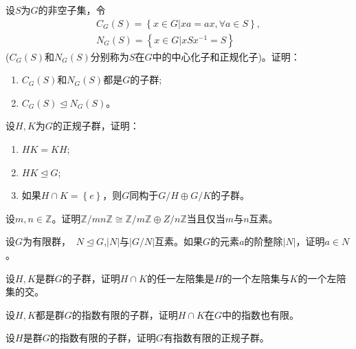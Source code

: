 \begin{prob}
设$S$为$G$的非空子集，令
\begin{equation*}
\begin{array}{*{20}{l}}
    C_{G}\left(S\right)=\left\{x\in G \vert xa=ax,\forall a\in S\right\},\\
    N_{G}\left(S\right)=\left\{x\in G \vert xSx^{-1}=S\right\}
\end{array}
\end{equation*}
($C_{G}\left(S\right)$和$N_{G}\left(S\right)$分别称为$S$在$G$中的{\heiti 中心化子}和{\heiti 正规化子})。证明：
\begin{enumerate}[$(1)$]
\item $C_{G}\left(S\right)$和$N_{G}\left(S\right)$都是$G$的子群;
\item $C_{G}\left(S\right)\trianglelefteq N_{G}\left(S\right)$。
\end{enumerate}
\end{prob}

\begin{prob}
设$H,K$为$G$的正规子群，证明：
\begin{enumerate}[$(1)$]
\item $HK=KH$;
\item $HK\trianglelefteq G$;
\item 如果$H\cap K=\left\{e \right\}$，则$G$同构于$G/H\oplus G/K$的子群。
\end{enumerate}
\end{prob}

\begin{prob}
设$m,n\in \mathbb{Z}$。证明$\mathbb{Z}/mn\mathbb{Z}\cong \mathbb{Z}/m\mathbb{Z}\oplus Z/n\mathbb{Z}$当且仅当$m$与$n$互素。
\end{prob}

\begin{prob}
设$G$为有限群，$\mathop{}N\trianglelefteq G$,$\left\lvert N \right\rvert $与$\left\lvert G/N \right\rvert $互素。如果$G$的元素$a$的阶整除$\left\lvert N \right\rvert $，证明$a\in N$。
\end{prob}

\begin{prob}
设$H,K$是群$G$的子群，证明$H\cap K$的任一左陪集是$H$的一个左陪集与$K$的一个左陪集的交。
\end{prob}

\begin{prob}
设$H,K$都是群$G$的指数有限的子群，证明$H\cap K$在$G$中的指数也有限。
\end{prob}

\begin{prob}
设$H$是群$G$的指数有限的子群，证明$G$有指数有限的正规子群。
\end{prob}

